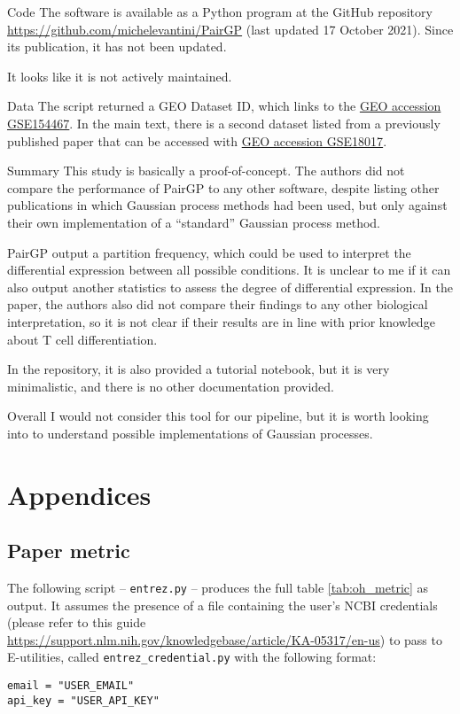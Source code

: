 \documentclass[10pt,a4paper]{article}
\newlength{\templength}
\newenvironment{ann_section}[1]
{\settowidth{\templength}{#1}%
\noindent\textbf{#1}
\hspace{1em}\begin{minipage}[t]{\dimexpr \linewidth-\the\templength-2em}}
{\end{minipage}\par\bigskip}
\begin{document}
\begin{ann_section}{Code}
The software is available as a Python program at the GitHub repository \url{https://github.com/michelevantini/PairGP} (last updated 17 October 2021). Since its publication, it has not been updated.

It looks like it is not actively maintained.
\end{ann_section}

\begin{ann_section}{Data}
The script returned a GEO Dataset ID, which links to the \href{https://www.ncbi.nlm.nih.gov/geo/query/acc.cgi?acc=GSE154467}{GEO accession GSE154467}. In the main text, there is a second dataset listed from a previously published paper that can be accessed with \href{https://www.ncbi.nlm.nih.gov/geo/query/acc.cgi?acc=GSE18017}{GEO accession GSE18017}.
\end{ann_section}

\begin{ann_section}{Summary}
This study is basically a proof-of-concept. The authors did not compare the performance of PairGP to any other software, despite listing other publications in which Gaussian process methods had been used, but only against their own implementation of a ``standard'' Gaussian process method.

PairGP output a partition frequency, which could be used to interpret the differential expression between all possible conditions. It is unclear to me if it can also output another statistics to assess the degree of differential expression. In the paper, the authors also did not compare their findings to any other biological interpretation, so it is not clear if their results are in line with prior knowledge about T cell differentiation.

In the repository, it is also provided a tutorial notebook, but it is very minimalistic, and there is no other documentation provided.

Overall I would not consider this tool for our pipeline, but it is worth looking into to understand possible implementations of Gaussian processes.
\end{ann_section}

\section{Appendices}
\subsection{Paper metric}
The following script -- \texttt{entrez.py} -- produces the full table \ref{tab:oh_metric} as output. It assumes the presence of a file containing the user's NCBI credentials (please refer to this guide \url{https://support.nlm.nih.gov/knowledgebase/article/KA-05317/en-us}) to pass to E-utilities, called \texttt{entrez\_credential.py} with the following format:
\begin{verbatim}
email = "USER_EMAIL"
api_key = "USER_API_KEY"
\end{verbatim}
\end{document}
